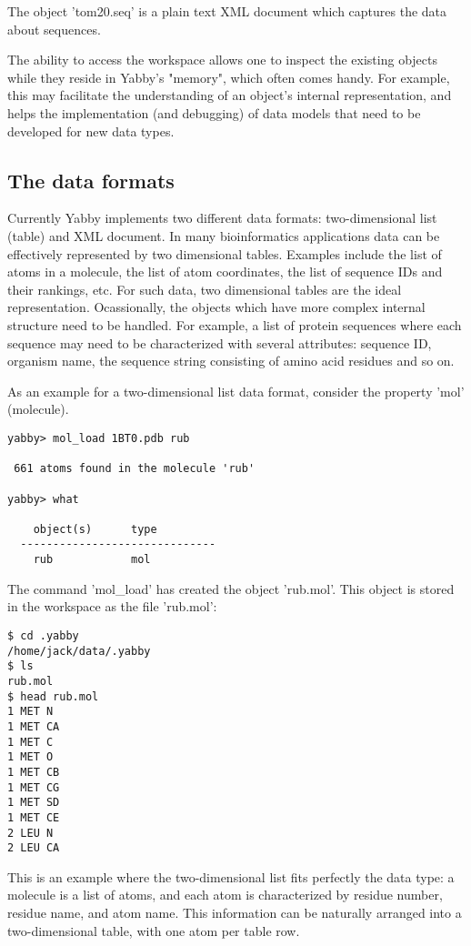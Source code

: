 The object 'tom20.seq' is a plain text XML document which captures
the data about sequences.

The ability to access the workspace allows one to inspect the
existing objects while they reside in Yabby's "memory", which
often comes handy. For example, this may facilitate the understanding
of an object's internal representation, and helps the implementation
(and debugging) of data models that need to be developed for new
data types. 

\subsection{The data formats}

Currently Yabby implements two different data formats: two-dimensional
list (table) and XML document. In many bioinformatics applications data
can be effectively represented by two dimensional tables. Examples
include the list of atoms in a molecule, the list of atom coordinates,
the list of sequence IDs and their rankings, etc. For such data, two
dimensional tables are the ideal representation. Ocassionally, the objects
which have more complex internal structure need to be handled. For
example, a list of protein sequences where each sequence may need to
be characterized with several attributes: sequence ID, organism name, 
the sequence string consisting of amino acid residues and so on.

As an example for a two-dimensional list data format, consider the
property 'mol' (molecule).

\begin{verbatim}
yabby> mol_load 1BT0.pdb rub

 661 atoms found in the molecule 'rub'

yabby> what

    object(s)      type
  ------------------------------
    rub            mol           
\end{verbatim}

The command 'mol\_load' has created the object 'rub.mol'. This object
is stored in the workspace as the file 'rub.mol':

\begin{verbatim}
$ cd .yabby
/home/jack/data/.yabby
$ ls
rub.mol
$ head rub.mol
1 MET N 
1 MET CA 
1 MET C 
1 MET O 
1 MET CB 
1 MET CG 
1 MET SD 
1 MET CE 
2 LEU N 
2 LEU CA 
\end{verbatim}

This is an example where the two-dimensional list fits perfectly
the data type: a molecule is a list of atoms, and each atom is
characterized by residue number, residue name, and atom name.
This information can be naturally arranged into a two-dimensional
table, with one atom per table row. 

